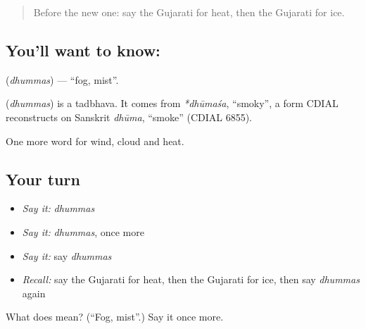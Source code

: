 \begin{quote}
Before the new one: say the Gujarati for heat, then the Gujarati for ice.
\end{quote}

\subsection*{You'll want to know: }
\textbf{} (\emph{dhummas}) — \textquotedblleft{}fog, mist\textquotedblright{}.

\begin{cousinweb}
\textbf{} (\emph{dhummas}) is a tadbhava. It comes from \emph{*dhūmaśa}, \textquotedblleft{}smoky\textquotedblright{}, a form CDIAL reconstructs on Sanskrit \emph{dhūma}, \textquotedblleft{}smoke\textquotedblright{} (CDIAL 6855).
\end{cousinweb}

\begin{grammarlens}[title={What you've built}]
One more word for wind, cloud and heat.
\end{grammarlens}

\subsection*{Your turn}
\begin{itemize}
\raggedright
  \item \emph{Say it:} \emph{dhummas}
  \item \emph{Say it:} \emph{dhummas}, once more
  \item \emph{Say it:} say \emph{dhummas}
  \item \emph{Recall:} say the Gujarati for heat, then the Gujarati for ice, then say \emph{dhummas} again
\end{itemize}

\begin{tcolorbox}[breakable,colback=teal!4,colframe=teal!35!black,title={Before you move on}]
What does  mean? (\textquotedblleft{}Fog, mist\textquotedblright{}.) Say it once more.
\end{tcolorbox}

